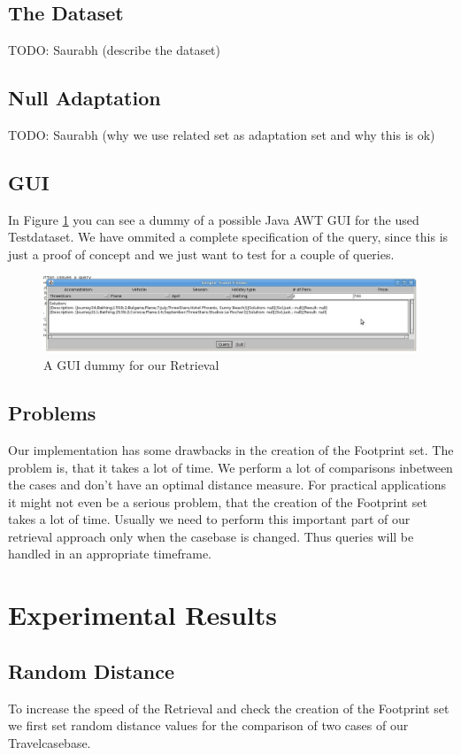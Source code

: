 \documentclass[11pt]{article}
\begin{document}
\subsection{The Dataset}
TODO: Saurabh (describe the dataset)

\subsection{Null Adaptation}
TODO: Saurabh (why we use related set as adaptation set and why this is ok)

\subsection{GUI}
In Figure \ref{fig:gui} you can see a dummy of a possible Java AWT GUI for the used Testdataset. We have ommited a complete specification of the query, since this is just a proof of concept and we just want to test for a couple of queries.

\begin{figure}[h]
\includegraphics[scale=0.3]{exampleRun.jpg}
\caption{A GUI dummy for our Retrieval}
\label{fig:gui}
\end{figure}

\subsection{Problems}
Our implementation has some drawbacks in the creation of the Footprint set. The problem is, that it takes a lot of time. We perform a lot of comparisons inbetween the cases and don't have an optimal distance measure. For practical applications it might not even be a serious problem, that the creation of the Footprint set takes a lot of time. Usually we need to perform this important part of our retrieval approach only when the casebase is changed. Thus queries will be handled in an appropriate timeframe.


\section{Experimental Results}

\subsection{Random Distance}
To increase the speed of the Retrieval and check the creation of the Footprint set we first set random distance values for the comparison of two cases of our Travelcasebase. 
\end{document}
